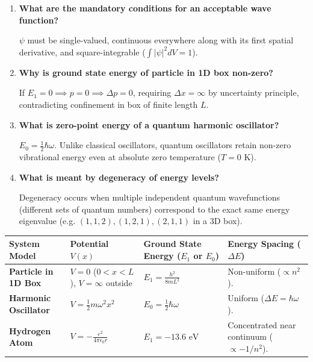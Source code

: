 \documentclass[12pt,a4paper]{article}
\newcommand{\Q}[1]{\textbf{#1}\par\noindent\ignorespaces}
\begin{document}
\begin{tcolorbox}[exambox, title={\textbf{Frequently Asked / Viva Questions}}]
\begin{enumerate}[topsep=0pt, label=\textbf{Q\arabic*.}, itemsep=5pt]
  \item \Q{What are the mandatory conditions for an acceptable wave function?}
  $\psi$ must be single-valued, continuous everywhere along with its first spatial derivative, and square-integrable ($\int |\psi|^2 dV = 1$).

  \item \Q{Why is ground state energy of particle in 1D box non-zero?}
  If $E_1 = 0 \implies p = 0 \implies \Delta p = 0$, requiring $\Delta x = \infty$ by uncertainty principle, contradicting confinement in box of finite length $L$.

  \item \Q{What is zero-point energy of a quantum harmonic oscillator?}
  $E_0 = \frac{1}{2}\hbar \omega$. Unlike classical oscillators, quantum oscillators retain non-zero vibrational energy even at absolute zero temperature ($T = 0\text{ K}$).

  \item \Q{What is meant by degeneracy of energy levels?}
  Degeneracy occurs when multiple independent quantum wavefunctions (different sets of quantum numbers) correspond to the exact same energy eigenvalue (e.g. $(1,1,2), (1,2,1), (2,1,1)$ in a 3D box).
\end{enumerate}
\end{tcolorbox}

\begin{tcolorbox}[tikzbox, title={Summary Comparison of Quantum Models}]
\centering
\begin{tabularx}{\linewidth}{|B{3.2cm}|Y|Y|Y|}
\hline
\textbf{System Model} & \textbf{Potential $V(x)$} & \textbf{Ground State Energy ($E_1$ or $E_0$)} & \textbf{Energy Spacing ($\Delta E$)} \\
\hline
\textbf{Particle in 1D Box} & $V=0$ ($0<x<L$), $V=\infty$ outside & $E_1 = \frac{h^2}{8mL^2}$ & Non-uniform ($\propto n^2$). \\
\hline
\textbf{Harmonic Oscillator} & $V = \frac{1}{2}m\omega^2 x^2$ & $E_0 = \frac{1}{2}\hbar\omega$ & Uniform ($\Delta E = \hbar\omega$). \\
\hline
\textbf{Hydrogen Atom} & $V = -\frac{e^2}{4\pi\epsilon_0 r}$ & $E_1 = -13.6\text{ eV}$ & Concentrated near continuum ($\propto -1/n^2$). \\
\hline
\end{tabularx}
\end{tcolorbox}
\end{document}

